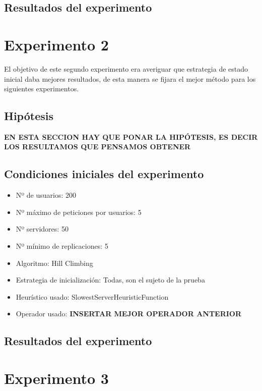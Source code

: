 \documentclass[a4paper,10pt]{report}
\begin{document}
		\section*{Resultados del experimento}
		
	\chapter*{Experimento 2}

		El objetivo de este segundo experimento era averiguar que estrategia de estado inicial daba mejores resultados, de esta manera se fijara el mejor método para los siguientes experimentos.\newline
		
	    \section*{Hipótesis}
		\textbf{EN ESTA SECCION HAY QUE PONAR LA HIPÓTESIS, ES DECIR LOS RESULTAMOS QUE PENSAMOS OBTENER}
	
		\section*{Condiciones iniciales del experimento}
		\begin{itemize}
		    \item Nº de usuarios: 200
    		\item Nº máximo de peticiones por usuarios: 5
    		\item Nº servidores: 50
    		\item Nº mínimo de replicaciones: 5
    		\item Algoritmo: Hill Climbing
    		\item Estrategia de inicialización: Todas, son el sujeto de la prueba 
    		\item Heurístico usado: SlowestServerHeuristicFunction
    		\item Operador usado: \textbf{INSERTAR MEJOR OPERADOR ANTERIOR}
		\end{itemize}

		\section*{Resultados del experimento}
		
		
	\chapter*{Experimento 3}
\end{document}
